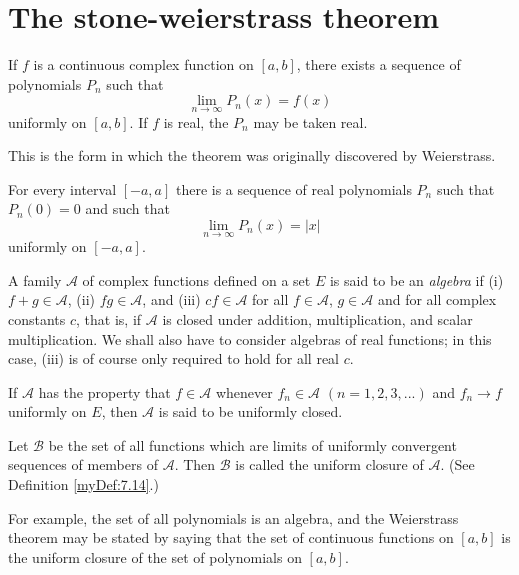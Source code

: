 \section{The stone-weierstrass theorem}

\begin{thm}
    \label{thm:7.26}
    If $f$ is a continuous complex function on $[a, b]$, 
    there exists a sequence of polynomials $P_n$ such that
    \begin{equation*}
        \lim_{n \to \infty} P_n(x) = f(x)        
    \end{equation*}
    uniformly on $[a, b]$. 
    If $f$ is real, the $P_n$ may be taken real.
\end{thm}

This is the form in which the theorem was originally discovered by
Weierstrass.


\begin{myCorollary}
    \label{myCorollary:7.27}
    For every interval $[-a, a]$ 
    there is a sequence of real polynomials $P_n$ such that $P_n(0) = 0$
    and such that
    \begin{equation*}
        \lim_{n \to \infty} P_n(x) = \left| x \right| 
    \end{equation*}
    uniformly on $[-a, a]$.
\end{myCorollary}


\begin{myDef}
    \label{myDef:7.28}
    A family $\mathscr{A}$ of complex functions defined on a set $E$
    is said to be an \emph{algebra} if 
    (i) $f + g \in \mathscr{A}$, 
    (ii) $fg \in \mathscr{A}$, and 
    (iii) $cf \in \mathscr{A}$ 
    for all $f \in \mathscr{A}$, $g \in \mathscr{A}$
    and for all complex constants $c$, 
    that is, if $\mathscr{A}$ is closed under addition, multiplication, and scalar multiplication. 
    We shall also have to consider algebras of real functions; 
    in this case, (iii) is of course only required to hold for all real $c$.
    
    If $\mathscr{A}$ has the property that $f \in \mathscr{A}$ whenever $f_n \in \mathscr{A}$ $(n = 1, 2, 3, ... )$ and
    $f_n \rightarrow f$ uniformly on $E$, 
    then $\mathscr{A}$ is said to be uniformly closed.
    
    Let $\mathscr{B}$ be the set of all functions which are limits of uniformly convergent sequences of members of $\mathscr{A}$. 
    Then $\mathscr{B}$ is called the uniform closure of $\mathscr{A}$. 
    (See Definition \ref{myDef:7.14}.)
    
    For example, the set of all polynomials is an algebra, and the Weierstrass theorem may be stated by saying that the set of continuous functions on $[a, b]$ is the uniform closure of the set of polynomials on $[a, b]$.
\end{myDef}

